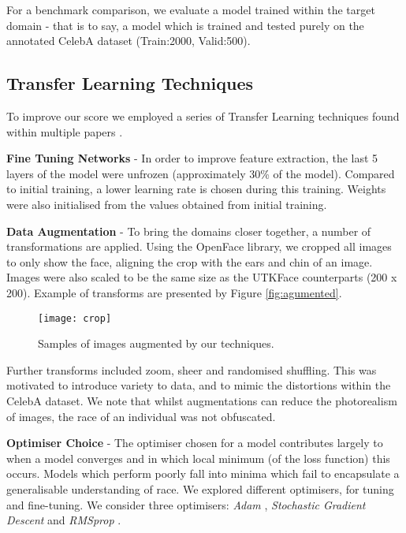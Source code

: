 \documentclass[10pt,twocolumn,letterpaper]{article}
\begin{document}
For a benchmark comparison, we evaluate a model trained within the target domain - that is to say, a model which is trained and tested purely on the annotated CelebA dataset (Train:2000, Valid:500).  

\subsection{Transfer Learning Techniques}
To improve our score we employed a series of Transfer Learning techniques found within multiple papers \cite{NIPS2012_4824,Razavian_2014_CVPR_Workshops}. 

\textbf{Fine Tuning Networks} - In order to improve feature extraction, the last 5 layers of the model were unfrozen (approximately 30\% of the model). Compared to initial training, a lower learning rate is chosen during this training. Weights were also initialised from the values obtained from initial training. 

\textbf{Data Augmentation} - To bring the domains closer together, a number of transformations are applied. Using the OpenFace library, we cropped all images to only show the face, aligning the crop with the ears and chin of an image. Images were also scaled to be the same size as the UTKFace counterparts (200 x 200). Example of transforms are presented by Figure \ref{fig:agumented}.

\begin{figure}[ht]
\begin{center}
   \texttt{[image: crop]}
\end{center}
   \caption{ \label{fig:agumented} Samples of images augmented by our techniques.}
\label{fig:augmented}
\end{figure}

Further transforms included zoom, sheer and randomised shuffling. This was motivated to introduce variety to data, and to mimic the distortions within the CelebA dataset. We note that whilst augmentations can reduce the photorealism of images, the race of an individual was not obfuscated.

\textbf{Optimiser Choice} - The optimiser chosen for a model contributes largely to when a model converges and in which local minimum (of the loss function) this occurs. Models which perform poorly fall into minima which fail to encapsulate a generalisable understanding of race. We explored different optimisers, for tuning and fine-tuning. We consider three optimisers: \textit{Adam} \cite{DBLP:journals/corr/KingmaB14}, \textit{Stochastic Gradient Descent}\cite{robbins1951} and \textit{RMSprop} \cite{hinton2012neural}. 
\end{document}
